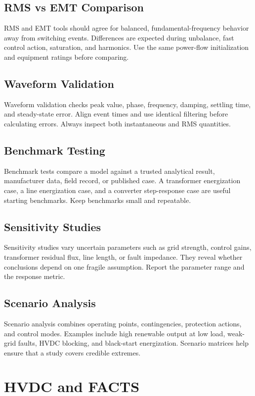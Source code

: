 \documentclass[11pt]{article}
\begin{document}
\subsection{RMS vs EMT Comparison}
RMS and EMT tools should agree for balanced, fundamental-frequency behavior away from switching events. Differences are expected during unbalance, fast control action, saturation, and harmonics. Use the same power-flow initialization and equipment ratings before comparing.

\subsection{Waveform Validation}
Waveform validation checks peak value, phase, frequency, damping, settling time, and steady-state error. Align event times and use identical filtering before calculating errors. Always inspect both instantaneous and RMS quantities.

\subsection{Benchmark Testing}
Benchmark tests compare a model against a trusted analytical result, manufacturer data, field record, or published case. A transformer energization case, a line energization case, and a converter step-response case are useful starting benchmarks. Keep benchmarks small and repeatable.

\subsection{Sensitivity Studies}
Sensitivity studies vary uncertain parameters such as grid strength, control gains, transformer residual flux, line length, or fault impedance. They reveal whether conclusions depend on one fragile assumption. Report the parameter range and the response metric.

\subsection{Scenario Analysis}
Scenario analysis combines operating points, contingencies, protection actions, and control modes. Examples include high renewable output at low load, weak-grid faults, HVDC blocking, and black-start energization. Scenario matrices help ensure that a study covers credible extremes.

\section{HVDC and FACTS}
\end{document}
